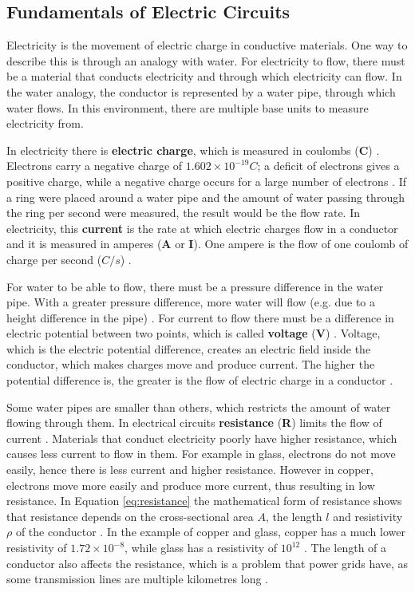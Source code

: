 \subsection{Fundamentals of Electric Circuits}\label{ssec:electric-circuits}
Electricity is the movement of electric charge in conductive materials. One way to describe this is through an analogy with water. For electricity to flow, there must be a material that conducts electricity and through which electricity can flow. In the water analogy, the conductor is represented by a water pipe, through which water flows. 
In this environment, there are multiple base units to measure electricity from.

In electricity there is \textbf{electric charge}, which is measured in coulombs (\textbf{C}) \cite{rl4network_operation}. Electrons carry a negative charge of $1.602 \times 10^{-19}C$; a deficit of electrons gives a positive charge, while a negative charge occurs for a large number of electrons \cite{fundamentals_circuit_analysis}. If a ring were placed around a water pipe and the amount of water passing through the ring per second were measured, the result would be the flow rate. In electricity, this \textbf{current} is the rate at which electric charges flow in a conductor and it is measured in amperes (\textbf{A} or \textbf{I}). One ampere is the flow of one coulomb of charge per second ($C/s$) \cite{fundamentals_circuit_analysis}.

For water to be able to flow, there must be a pressure difference in the water pipe. With a greater pressure difference, more water will flow (e.g. due to a height difference in the pipe) \cite{rl4network_operation}. For current to flow there must be a difference in electric potential between two points, which is called \textbf{voltage} (\textbf{V}) \cite{rl4network_operation}. Voltage, which is the electric potential difference, creates an electric field inside the conductor, which makes charges move and produce current. The higher the potential difference is, the greater is the flow of electric charge in a conductor \cite{fundamentals_e_circuits}.

Some water pipes are smaller than others, which restricts the amount of water flowing through them. 
In electrical circuits \textbf{resistance} (\textbf{R}) limits the flow of current \cite{rl4network_operation}. Materials that conduct electricity poorly have higher resistance, which causes less current to flow in them. For example in glass, electrons do not move easily, hence there is less current and higher resistance. However in copper, electrons move more easily and produce more current, thus resulting in low resistance. In Equation \eqref{eq:resistance} the mathematical form of resistance shows that resistance depends on the cross-sectional area $A$, the length $l$ and resistivity $\rho$ of the conductor \cite{fundamentals_e_circuits}. In the example of copper and glass, copper has a much lower resistivity of $1.72 \times 10^{-8}$, while glass has a resistivity of $10^{12}$ \cite{fundamentals_e_circuits}. The length of a conductor also affects the resistance, which is a problem that power grids have, as some transmission lines are multiple kilometres long \cite{hvdcReviewIEEE}.

